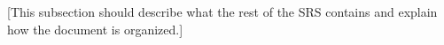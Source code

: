 [This subsection should describe what the rest 
of the SRS contains and explain how the document 
is organized.]
